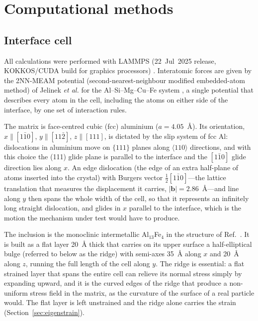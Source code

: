 \section{Computational methods}
\label{sec:methods}

\subsection{Interface cell}
\label{sec:cell}

All calculations were performed with LAMMPS (22~Jul~2025 release, KOKKOS/CUDA
build for graphics processors) \cite{Thompson2022LAMMPS}. Interatomic forces
are given by the 2NN-MEAM potential (second-nearest-neighbour modified
embedded-atom method) of Jelinek \emph{et al.} for the Al--Si--Mg--Cu--Fe
system \cite{Jelinek2012}, a single potential that describes every atom in
the cell, including the atoms on either side of the interface, by one set of
interaction rules.

The matrix is face-centred cubic (fcc) aluminium ($a=4.05$~\AA{}). Its
orientation, $x\parallel[1\bar{1}0]$, $y\parallel[11\bar{2}]$,
$z\parallel[111]$, is dictated by the slip system of fcc Al: dislocations in
aluminium move on $\{111\}$ planes along $\langle110\rangle$ directions, and
with this choice the (111) glide plane is parallel to the interface and the
$[1\bar{1}0]$ glide direction lies along $x$. An edge dislocation (the edge
of an extra half-plane of atoms inserted into the crystal) with Burgers
vector $\tfrac{1}{2}[1\bar{1}0]$---the lattice translation that measures the
displacement it carries, $|\mathbf{b}|=2.86$~\AA{}---and line along $y$ then spans the whole width of the cell, so that it
represents an infinitely long straight dislocation, and glides in $x$
parallel to the interface,
which is the motion the mechanism under test would have to produce.

The inclusion is the monoclinic intermetallic Al$_{13}$Fe$_4$ in the
structure of Ref.~\cite{Liu2024CIF}. It is built as a flat layer 20~\AA{}
thick that carries on its upper surface a half-elliptical bulge (referred to
below as the ridge) with semi-axes 35~\AA{} along $x$ and 20~\AA{} along $z$,
running the full length of the cell along $y$. The ridge is essential: a
flat strained layer that spans the entire cell can relieve its normal stress
simply by expanding upward, and it is the curved edges of the ridge that
produce a non-uniform stress field in the matrix, as the curvature of the
surface of a real particle would. The flat layer is left unstrained and the ridge alone carries the strain
(Section~\ref{sec:eigenstrain}).

